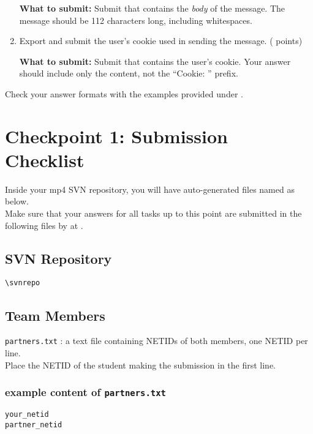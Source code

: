 \begin{enumerate}
    \textbf{What to submit:} Submit
      \texttt{\hyperlink{msgformat}{\filemsg}} that contains the \textit{body} of the message.
      The message should be 112 characters long, including whitespaces.

  \item \hypertarget{cp1cookie}{Export and submit the user's cookie used in sending the message. ( points)} \label{itm:cookie}

    \textbf{What to submit:} Submit
      \texttt{\hyperlink{cookieformat}{\filecookie}} that contains the user's cookie.
      Your answer should include only the content, not the ``Cookie: '' prefix.

\end{enumerate}

Check your answer formats with the examples provided under \textit{}.

\newpage

\section*{Checkpoint 1: Submission Checklist}
\label{sec:cp1checklist}

Inside your mp4 SVN repository, you will have auto-generated files named as below.\\
Make sure that your answers for all tasks up to this point are submitted in the following files by \textbf{\checkpointduedate} at \textbf{\duetime}.

\subsection*{SVN Repository}
\nolinkurl{\svnrepo}

\subsection*{Team Members}
\texttt{partners.txt} : a text file containing NETIDs of both members, one NETID per line.\\
Place the NETID of the student making the submission in the first line.
\vspace{-12pt}
\hypertarget{cp1partners}{}
\subsubsection*{example content of \texttt{partners.txt}}
\begin{mdframed}
\begin{Verbatim}
your_netid
partner_netid
\end{Verbatim}
\end{mdframed}

